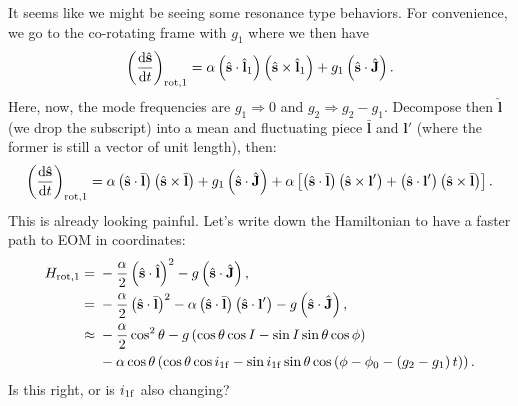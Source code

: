 \documentclass[11pt,
        usenames, %
        dvipsnames %
    ]{article}
\newcommand*{\rd}[2]{\frac{\mathrm{d}#1}{\mathrm{d}#2}}
\newcommand*{\bm}[1]{\boldsymbol{\mathbf{#1}}}
\newcommand*{\uv}[1]{\hat{\bm{#1}}}
\newcommand*{\p}[1]{\left(#1\right)}
\newcommand*{\s}[1]{\left[#1\right]}
\begin{document}
It seems like we might be seeing some resonance type behaviors. For convenience,
we go to the co-rotating frame with $g_1$ where we then have
\begin{equation}
    \p{\rd{\uv{s}}{t}}_{\rm rot, 1}
        = \alpha\p{\uv{s} \cdot \uv{l}_1}\p{\uv{s} \times \uv{l}_1}
            + g_1\p{\uv{s} \cdot \uv{J}}.
\end{equation}
Here, now, the mode frequencies are $g_1 \Rightarrow 0$ and $g_2 \Rightarrow g_2
- g_1$. Decompose then $\uv{l}$ (we drop the subscript) into a mean and fluctuating
piece $\bar{\bm{l}}$ and $\bm{l}'$ (where the former is still a vector of unit
length), then:
\begin{equation}
    \p{\rd{\uv{s}}{t}}_{\rm rot, 1}
        = \alpha\p{\uv{s} \cdot \bar{\bm{l}}}\p{\uv{s} \times \bar{\bm{l}}}
            + g_1\p{\uv{s} \cdot \uv{J}}
            + \alpha\s{
                \p{\uv{s} \cdot \bar{\bm{l}}}
                \p{\uv{s} \times \bm{l}'} +
                \p{\uv{s} \cdot \bm{l}'}
                \p{\uv{s} \times \bar{\bm{l}}}
            }.
\end{equation}
This is already looking painful. Let's write down the Hamiltonian to have a
faster path to EOM in coordinates:
\begin{align}
    H_{\rm rot, 1} ={}& -\frac{\alpha}{2}\p{\uv{s} \cdot \uv{l}}^2
            - g\p{\uv{s} \cdot \uv{J}},\\
        ={}& -\frac{\alpha}{2}\p{\uv{s} \cdot \bar{\bm{l}}}^2
            - \alpha\p{\uv{s} \cdot \bar{\bm{l}}}
                \p{\uv{s} \cdot \bm{l}'}
            - g\p{\uv{s} \cdot \uv{J}},\\
        \approx{}& -\frac{\alpha}{2}\cos^2\theta
            - g\p{\cos \theta \cos I - \sin I \sin \theta \cos \phi}\nonumber\\
        & - \alpha \cos \theta\p{
            \cos \theta \cos i_{\rm 1f}
            - \sin i_{\rm 1f} \sin \theta \cos \p{\phi - \phi_0 - \p{g_2 -
            g_1}t}}.
\end{align}
Is this right, or is $i_{\rm 1f}$ also changing?
\end{document}

